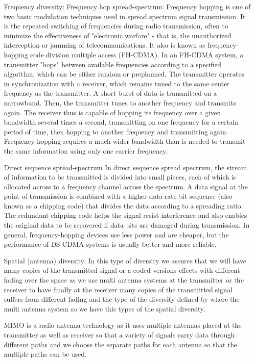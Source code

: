 Frequency diversity:
	Frequency hop spread-spectrum:
Frequency hopping is one of two basic modulation techniques used in spread spectrum signal transmission. It is the repeated switching of frequencies during radio transmission, often to minimize the effectiveness of "electronic warfare" - that is, the unauthorized interception or jamming of telecommunications. It also is known as frequency- hopping code division multiple access (FH-CDMA).
In an FH-CDMA system, a transmitter "hops" between available frequencies according to a specified algorithm, which can be either random or preplanned. The transmitter operates in synchronization with a receiver, which remains tuned to the same center frequency as the transmitter. A short burst of data is transmitted on a narrowband. Then, the transmitter tunes to another frequency and transmits again. The receiver thus is capable of hopping its frequency over a given bandwidth several times a second, transmitting on one frequency for a certain period of time, then hopping to another frequency and transmitting again. Frequency hopping requires a much wider bandwidth than is needed to transmit the same information using only one carrier frequency.

	Direct sequence spread-spectrum
In direct sequence spread spectrum, the stream of information to be transmitted is divided into small pieces, each of which is allocated across to a frequency channel across the spectrum. A data signal at the point of transmission is combined with a higher data-rate bit sequence (also known as a chipping code) that divides the data according to a spreading ratio. The redundant chipping code helps the signal resist interference and also enables the original data to be recovered if data bits are damaged during transmission.
In general, frequency-hopping devices use less power and are cheaper, but the performance of DS-CDMA systems is usually better and more reliable.
      

Spatial (antenna) diversity:
In this type of diversity we assures that we will have many copies of the transmitted signal or a coded versions effects with different fading over the space as we use multi antenna systems at the transmitter or the receiver to have finally at the receiver many copies of the transmitted signal suffers from different fading and the type of the diversity defined by where the multi antenna system so we have this types of the spatial diversity.


MIMO is a radio antenna technology as it uses multiple antennas placed at the transmitter as well as receiver so that a variety of signals carry data through different paths and we choose the separate paths for each antenna so that the multiple paths can be used.

















